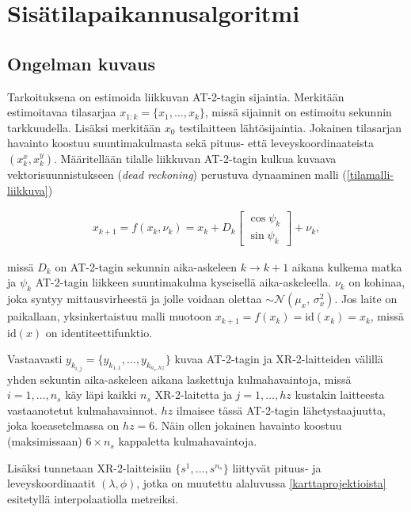 \documentclass[
  12pt,
  a4paper, twoside]{book}
\begin{document}
\section{Sisätilapaikannusalgoritmi}

\subsection{Ongelman kuvaus} \label{ongelman-kuvaus}

Tarkoituksena on estimoida liikkuvan AT-2-tagin sijaintia. Merkitään estimoitavaa tilasarjaa \(x_{1:k}=\{x_1,\ldots,x_k\}\), missä sijainnit on estimoitu sekunnin tarkkuudella. Lisäksi merkitään \(x_0\) testilaitteen lähtösijaintia. Jokainen tilasarjan havainto koostuu suuntimakulmasta sekä pituus- että leveyskoordinaateista \((x_k^x, x_k^y)\). Määritellään tilalle liikkuvan AT-2-tagin kulkua kuvaava vektorisuunnistukseen (\emph{dead reckoning}) perustuva dynaaminen malli (\ref{tilamalli-liikkuva})

\begin{align}\label{tilamalli-liikkuva}
x_{k+1}=f(x_k, \nu_k)=x_k+D_k \begin{bmatrix} \cos\psi_k \\ \sin\psi_k \end{bmatrix}+\nu_k,
\end{align}

\noindent missä \(D_k\) on AT-2-tagin sekunnin aika-askeleen \(k \rightarrow k+1\) aikana kulkema matka ja \(\psi_k\) AT-2-tagin liikkeen suuntimakulma kyseisellä aika-askeleella. \(\nu_k\) on kohinaa, joka syntyy mittausvirheestä ja jolle voidaan olettaa \(\sim \mathcal{N}(\mu_x,\,\sigma_x^{2})\). Jos laite on paikallaan, yksinkertaistuu malli muotoon \(x_{k+1}=f(x_k)=\text{id}(x_k)=x_k\), missä \(\text{id}(x)\) on identiteettifunktio.

Vastaavasti \(y_{k_{i,j}}=\{y_{k_{1,1}},\ldots,y_{k_{n_s,hz}}\}\) kuvaa AT-2-tagin ja XR-2-laitteiden välillä yhden sekuntin aika-askeleen aikana laskettuja kulmahavaintoja, missä \(i=1,\ldots,n_s\) käy läpi kaikki \(n_s\) XR-2-laitetta ja \(j=1,\ldots,hz\) kustakin laitteesta vastaanotetut kulmahavainnot. \(hz\) ilmaisee tässä AT-2-tagin lähetystaajuutta, joka koeasetelmassa on \(hz=6\). Näin ollen jokainen havainto koostuu (maksimissaan) \(6\times n_s\) kappaletta kulmahavaintoja.

\noindent Lisäksi tunnetaan XR-2-laitteisiin \(\{s^1,\ldots,s^{n_s}\}\) liittyvät pituus- ja leveyskoordinaatit \((\lambda, \phi)\), jotka on muutettu alaluvussa \ref{karttaprojektioista} esitetyllä interpolaatiolla metreiksi.
\end{document}
